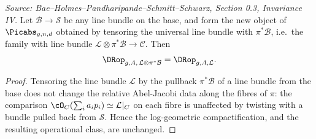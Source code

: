 \begin{lemma}
  \label{lem:invariance_twisting_pullback}
  \textit{Source: Bae--Holmes--Pandharipande--Schmitt--Schwarz, Section 0.3, Invariance IV.}
  Let $\mathcal{B} \to \mathcal{S}$ be any line bundle on the base, and form the new object
  of $\Picabs_{g,n,d}$ obtained by tensoring the universal line bundle with $\pi^*\mathcal{B}$,
  i.e.\ the family with line bundle $\mathcal{L} \otimes \pi^*\mathcal{B} \to \mathcal{C}$.
  Then
  \[
    \DRop_{g,A,\,\mathcal{L} \otimes \pi^*\mathcal{B}} = \DRop_{g,A,\mathcal{L}}.
  \]
\end{lemma}

\begin{proof}
  Tensoring the line bundle $\mathcal{L}$ by the pullback $\pi^*\mathcal{B}$ of a line bundle
  from the base does not change the relative Abel-Jacobi data along the fibres of $\pi$:
  the comparison $\cO_C(\sum_i a_i p_i) \simeq \mathcal{L}|_C$ on each fibre is unaffected by
  twisting with a bundle pulled back from $\mathcal{S}$.  Hence the log-geometric
  compactification, and the resulting operational class, are unchanged.
\end{proof}

